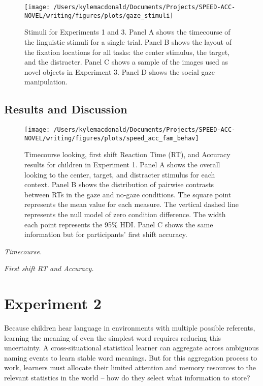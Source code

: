\documentclass[man,floatsintext]{apa6}
\begin{document}
\begin{figure}[!t]

{\centering \texttt{[image: /Users/kylemacdonald/Documents/Projects/SPEED-ACC-NOVEL/writing/figures/plots/gaze\_stimuli]} 

}

\caption{Stimuli for Experiments 1 and 3. Panel A shows the timecourse of the linguistic stimuli for a single trial. Panel B shows the layout of the fixation locations for all tasks: the center stimulus, the target, and the distracter. Panel C shows a sample of the images used as novel objects in Experiment 3. Panel D shows the social gaze manipulation.}\label{fig:gaze-stimuli}
\end{figure}

\subsection{Results and Discussion}\label{results-and-discussion}

\begin{figure}[!t]

{\centering \texttt{[image: /Users/kylemacdonald/Documents/Projects/SPEED-ACC-NOVEL/writing/figures/plots/speed\_acc\_fam\_behav]} 

}

\caption{Timecourse looking, first shift Reaction Time (RT), and Accuracy results for children in Experiment 1. Panel A shows the overall looking to the center, target, and distracter stimulus for each context. Panel B shows the distribution of pairwise contrasts between RTs in the gaze and no-gaze conditions. The square point represents the mean value for each measure. The vertical dashed line represents the null model of zero condition difference. The width each point represents the 95\% HDI. Panel C shows the same information but for participants' first shift accuracy.}\label{fig:speed-acc-gaze-results}
\end{figure}

\emph{Timecourse.}

\emph{First shift RT and Accuracy.}

\section{Experiment 2}\label{experiment-2}

Because children hear language in environments with multiple possible
referents, learning the meaning of even the simplest word requires
reducing this uncertainty. A cross-situational statistical learner can
aggregate across ambiguous naming events to learn stable word meanings.
But for this aggregation process to work, learners must allocate their
limited attention and memory resources to the relevant statistics in the
world -- how do they select what information to store?
\end{document}

